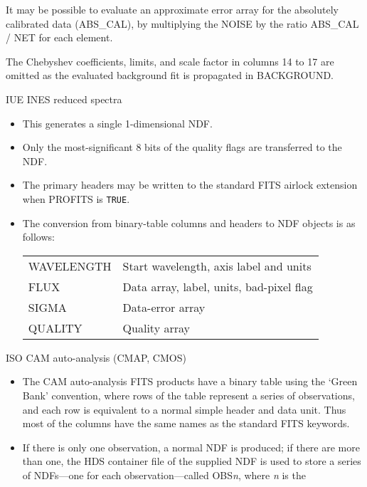 \documentclass[twoside,11pt]{article}
\newcommand{\htmladdnormallink}[2]{#1}
\newcommand{\ssthitemlist}[1]{
  \latexonly{
  \mbox{} \\
  \vspace{-3.5ex}
  }
  \begin{itemize}
     #1
  \end{itemize}
}
\newcommand{\sstitem}{\item}
\newcommand{\sstitem}{\item}
\begin{document}
{{{{            \sstitem
            It may be possible to evaluate an approximate error array for
            the absolutely calibrated data (ABS\_CAL), by multiplying the
            NOISE by the ratio ABS\_CAL / NET for each element.
            \sstitem
            The Chebyshev coefficients, limits, and scale factor in
            columns 14 to 17 are omitted as the evaluated background fit is
            propagated in BACKGROUND.
         }
         \bigskip
         \sstitem
         IUE \htmladdnormallink{INES}{http://ines.laeff.esa.es/} reduced spectra
         \ssthitemlist{
            \sstitem
            This generates a single 1-dimensional NDF. 
            \sstitem
            Only the most-significant 8 bits of the quality flags are
            transferred to the NDF.
            \sstitem
            The primary headers may be written to the standard FITS
            airlock extension when PROFITS is \texttt{TRUE}.
            \sstitem
            The conversion from binary-table columns and headers to NDF
            objects is as follows:
            \\[\medskipamount]
            \begin{tabular}{lp{90mm}}
            WAVELENGTH         &   Start wavelength, axis label and units \\
            FLUX               &   Data array, label, units, bad-pixel flag \\
            SIGMA              &   Data-error array \\
            QUALITY            &   Quality array \\
            \end{tabular}
         }
         \bigskip
         \sstitem
         \htmladdnormallink{ISO}{http://www.iso.vilspa.esa.es/users/idc/IDC.html}
         CAM auto-analysis (CMAP, CMOS)
         \ssthitemlist{
            \sstitem
            The CAM auto-analysis FITS products have a binary table
            using the `Green Bank' convention, where rows
            of the table represent a series of observations, and each
            row is equivalent to a normal simple header and data unit.  Thus
            most of the columns have the same names as
            the standard FITS keywords.
            \sstitem
            If there is only one observation, a normal NDF is produced; if
            there are more than one, the HDS container file of the supplied
            NDF is used to store a series of NDFs---one for each
            observation---called OBS\textit{n}, where \textit{n} is the 
}}}}
\end{document}
